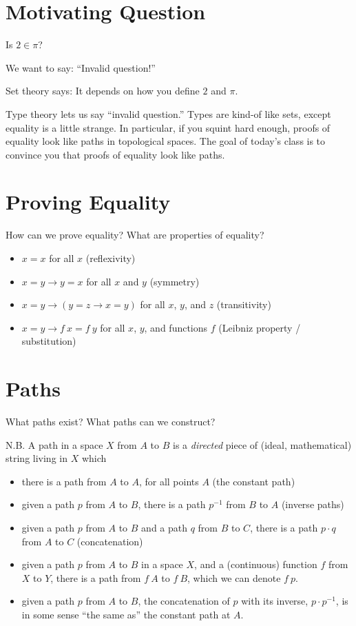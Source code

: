 \documentclass{article}
\theoremstyle{definition}
\begin{document}
\section{Motivating Question}
  Is $2 \in \pi$?
  
  We want to say: ``Invalid question!''
  
  Set theory says: It depends on how you define $2$ and $\pi$.
  
  Type theory lets us say ``invalid question.''  Types are kind-of like sets, except equality is a little strange.  In particular, if you squint hard enough, proofs of equality look like paths in topological spaces.  The goal of today's class is to convince you that proofs of equality look like paths.

\section{Proving Equality}
How can we prove equality?  What are properties of equality?
\begin{itemize}
  \item $x = x$ for all $x$ (reflexivity)
  \item $x = y \to y = x$ for all $x$ and $y$ (symmetry)
  \item $x = y \to (y = z \to x = y)$ for all $x$, $y$, and $z$ (transitivity)
  \item $x = y \to f~x = f~y$ for all $x$, $y$, and functions $f$ (Leibniz property / substitution)
\end{itemize}

\section{Paths}
What paths exist?  What paths can we construct?

N.B. A path in a space $X$ from $A$ to $B$ is a \emph{directed} piece of (ideal, mathematical) string living in $X$ which 
\begin{itemize}
  \item there is a path from $A$ to $A$, for all points $A$ (the constant path)
  \item given a path $p$ from $A$ to $B$, there is a path $p^{-1}$ from $B$ to $A$ (inverse paths)
  \item given a path $p$ from $A$ to $B$ and a path $q$ from $B$ to $C$, there is a path $p \cdot q$ from $A$ to $C$ (concatenation)
  \item given a path $p$ from $A$ to $B$ in a space $X$, and a (continuous) function $f$ from $X$ to $Y$, there is a path from $f~A$ to $f~B$, which we can denote $f~p$.
  \item given a path $p$ from $A$ to $B$, the concatenation of $p$ with its inverse, $p \cdot p^{-1}$, is in some sense ``the same as'' the constant path at $A$.
\end{itemize}
\end{document}
